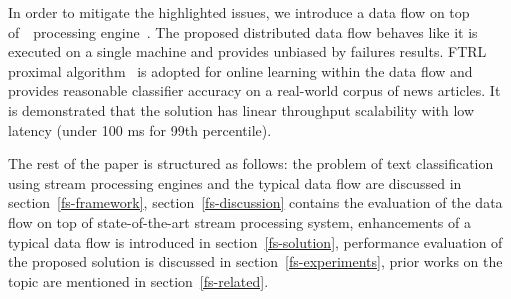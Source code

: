 In order to mitigate the highlighted issues, we introduce a data flow on top of~\FlameStream\ processing engine~\cite{we2018beyondmr, we2018adbis}. The proposed distributed data flow behaves like it is executed on a single machine and provides unbiased by failures results. FTRL proximal algorithm~\cite{mcmahan2013ad} is adopted for online learning within the data flow and provides reasonable classifier accuracy on a real-world corpus of news articles. It is demonstrated that the solution has linear throughput scalability with low latency (under 100 ms for 99th percentile).

The rest of the paper is structured as follows: the problem of text classification using stream processing engines and the typical data flow are discussed in section~\ref{fs-framework}, section~\ref{fs-discussion} contains the evaluation of the data flow on top of state-of-the-art stream processing system, enhancements of a typical data flow is introduced in section~\ref{fs-solution}, performance evaluation of the proposed solution is discussed in section~\ref{fs-experiments}, prior works on the topic are mentioned in section~\ref{fs-related}.